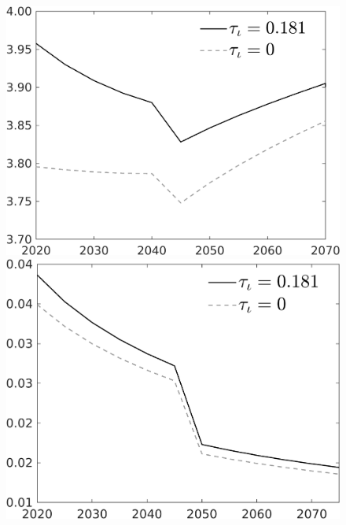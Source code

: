 \begin{figure}[h!!]
\begin{minipage}[]{0.32\textwidth}
\end{minipage}	
\begin{minipage}[]{0.32\textwidth}
\includegraphics[width=1\textwidth]{../../codding_model/own_basedOnFried/optimalPol_010922_revision/figures/all_13Sept22/CompTaul_Reg0_gAagg_spillover0_nsk0_xgr0_sep1_LFlimit1_emsbase0_countec0_GovRev1_etaa0.79_lgd1.png}
\end{minipage}
\begin{minipage}[]{0.32\textwidth}
\includegraphics[width=1\textwidth]{../../codding_model/own_basedOnFried/optimalPol_010922_revision/figures/all_13Sept22/CompTaul_Reg0_sff_spillover0_nsk0_xgr0_sep1_LFlimit1_emsbase0_countec0_GovRev1_etaa0.79_lgd1.png}

\end{minipage}
\end{figure}
